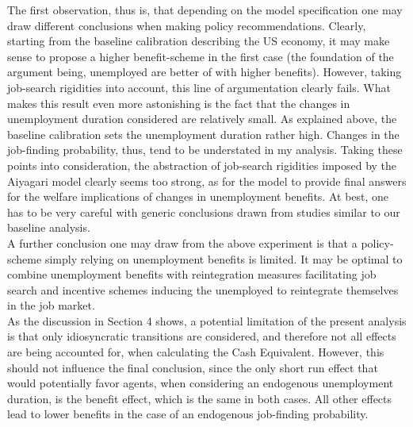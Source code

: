 \documentclass[a4paper,11pt]{article}
\begin{document}
The first observation, thus is, that depending on the model specification one may draw different conclusions when making policy recommendations. Clearly, starting from the baseline calibration describing the US economy, it may make sense to propose a higher benefit-scheme in the first case (the foundation of the argument being, unemployed are better of with higher benefits). However, taking job-search rigidities into account, this line of argumentation clearly fails. What makes this result even more astonishing is the fact that the changes in unemployment duration considered are relatively small. As explained above, the baseline calibration sets the unemployment duration rather high. Changes in the job-finding probability, thus, tend to be understated in my analysis. Taking these points into consideration, the abstraction of job-search rigidities imposed by the Aiyagari model clearly seems too strong, as for the model to provide final answers for the welfare implications of changes in unemployment benefits. At best, one has to be very careful with generic conclusions drawn from studies similar to our baseline analysis. \\
A further conclusion one may draw from the above experiment is that a policy-scheme simply relying on unemployment benefits is limited. It may be optimal to combine unemployment benefits with reintegration measures facilitating job search and incentive schemes inducing the unemployed to reintegrate themselves in the job market. \\
As the discussion in Section 4 shows, a potential limitation of the present analysis is that only idiosyncratic transitions are considered, and therefore not all effects are being accounted for, when calculating the Cash Equivalent. However, this should not influence the final conclusion, since the only short run effect that would potentially favor agents, when considering  an endogenous unemployment duration, is the benefit effect, which is the same in both cases. All other effects lead to lower benefits in the case of an endogenous job-finding probability.




\newpage



\end{document}
